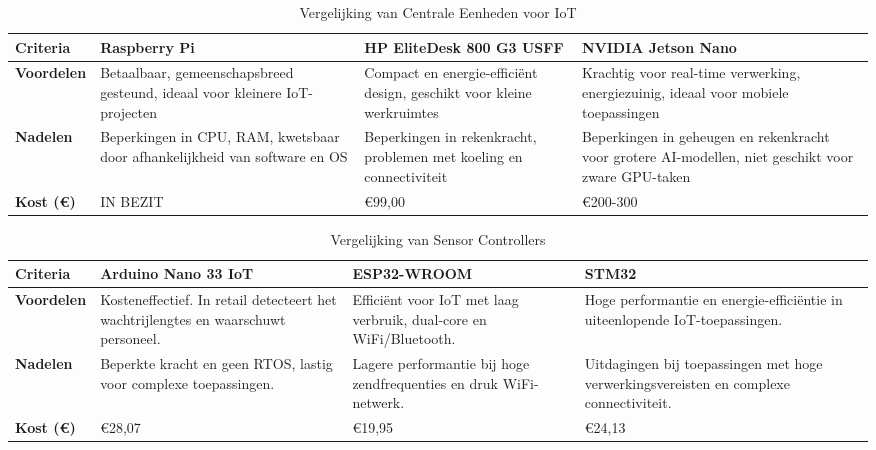 \begin{table}[h!]
    \tiny
    \caption{Vergelijking van Centrale Eenheden voor IoT \autocite{Calvo2016, Hosny2023, SainzRaso2019, 王丁2014, Pham2024, Chatterjee2022}}
    \label{tab:vergelijking-centrale-eenheid}
    \begin{tabular}{|p{1.5cm}|p{3.5cm}|p{3.5cm}|p{3.5cm}|}
        \hline
        \textbf{Criteria} & \textbf{Raspberry Pi} & \textbf{HP EliteDesk 800 G3 USFF} & \textbf{NVIDIA Jetson Nano} \\
        \hline
        \textbf{Voordelen} & Betaalbaar, gemeenschapsbreed gesteund, ideaal voor kleinere IoT-projecten & Compact en energie-efficiënt design, geschikt voor kleine werkruimtes & Krachtig voor real-time verwerking, energiezuinig, ideaal voor mobiele toepassingen \\
        \hline
        \textbf{Nadelen} & Beperkingen in CPU, RAM, kwetsbaar door afhankelijkheid van software en OS & Beperkingen in rekenkracht, problemen met koeling en connectiviteit & Beperkingen in geheugen en rekenkracht voor grotere AI-modellen, niet geschikt voor zware GPU-taken  \\
        \hline
        \textbf{Kost (€)} & IN BEZIT & €99,00 & €200-300 \\
        \hline
    \end{tabular}
\end{table}


\begin{table}[h]
    \tiny
    \caption{Vergelijking van Sensor Controllers \autocite{Hussain2024, Viriyavisuthisakul2017, Spohn2020, Maier2017, Wang2020, Wu2020, Kovacshazy2024}}
    \label{tab:vergelijking-sensorcontroller}
    \begin{tabular}{|p{1.5cm}|p{3.5cm}|p{3.5cm}|p{3.5cm}|}
        \hline
        \textbf{Criteria} & \textbf{Arduino Nano 33 IoT} & \textbf{ESP32-WROOM} & \textbf{STM32} \\
        \hline
        \textbf{Voordelen} 
        & Kosteneffectief. In retail detecteert het wachtrijlengtes en waarschuwt personeel. 
        & Efficiënt voor IoT met laag verbruik, dual-core en WiFi/Bluetooth. 
        & Hoge performantie en energie-efficiëntie in uiteenlopende IoT-toepassingen. \\
        \hline
        \textbf{Nadelen} 
        & Beperkte kracht en geen RTOS, lastig voor complexe toepassingen. 
        & Lagere performantie bij hoge zendfrequenties en druk WiFi-netwerk. 
        & Uitdagingen bij toepassingen met hoge verwerkingsvereisten en complexe connectiviteit. \\
        \hline
        \textbf{Kost (€)} 
        & €28,07 
        & €19,95 
        & €24,13 \\
        \hline
    \end{tabular}
\end{table}


